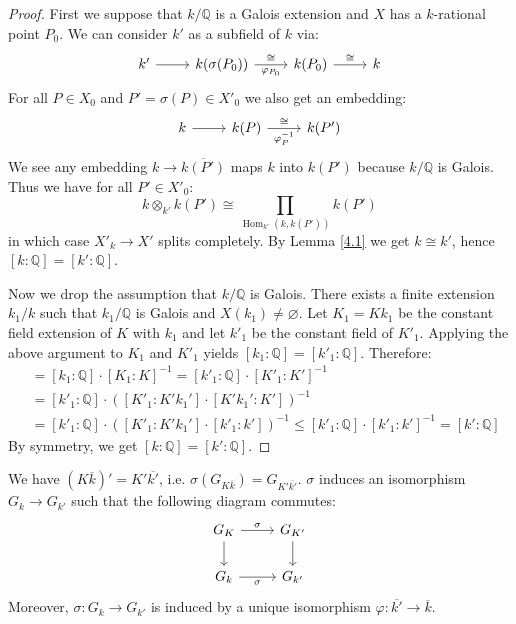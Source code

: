 \begin{proof}
First we suppose that $k/\mathbb{Q}$ is a Galois extension and $X$ has a $k$-rational point $P_0$. We can consider $k'$ as a subfield of $k$ via: 
\[\begin{tikzcd}
k'\ar[r] & k(\sigma(P_0))\ar[r, "\varphi_{P_0}"', "\cong"] & k(P_0) \ar[r, "\cong"] & k
\end{tikzcd}\]
For all $P\in X_0$ and $P'=\sigma(P)\in X'_0$ we also get an embedding:
\[ \begin{tikzcd}
k \ar[r] & k(P) \ar[r, "\varphi_P^{-1}"', "\cong"] & k(P')
\end{tikzcd} \]
We see any embedding $k\to \overline{k(P')}$ maps $k$ into $k(P')$ because $k/\mathbb{Q}$ is Galois. Thus we have for all $P'\in X'_0$:
\[ k\otimes_{k'} k(P')\cong \prod_{\operatorname{Hom}_{k'}(k, k(P'))} k(P') \]
in which case $X'_k\to X'$ splits completely. By Lemma \ref{4.1} we get $k\cong k'$, hence $[k:\mathbb{Q}]= [k':\mathbb{Q}]$.

Now we drop the assumption that $k/\mathbb{Q}$ is Galois. There exists a finite extension $k_1/k$ such that $k_1/\mathbb{Q}$ is Galois and $X(k_1)\neq\varnothing$. Let $K_1 = Kk_1$ be the constant field extension of $K$ with $k_1$ and let $k'_1$ be the constant field of $K'_1$. Applying the above argument to $K_1$ and $K'_1$ yields $[k_1:\mathbb{Q}] = [k'_1:\mathbb{Q}]$. Therefore:
\begin{align*}
[k:\mathbb{Q}] &= [k_1:\mathbb{Q}]\cdot [K_1:K]^{-1} = [k'_1:\mathbb{Q}]\cdot [K'_1:K']^{-1}\\
&= [k'_1:\mathbb{Q}]\cdot ([K'_1: K'k_1'] \cdot [K'k_1':K'])^{-1}\\
&= [k'_1:\mathbb{Q}]\cdot  ([K'_1: K'k_1'] \cdot [k'_1:k'])^{-1} \leq [k'_1:\mathbb{Q}]\cdot [k'_1:k']^{-1} = [k':\mathbb{Q}]
\end{align*}
By symmetry, we get $[k:\mathbb{Q}] = [k':\mathbb{Q}]$.
\end{proof}

\begin{lemma}\label{4.2}
We have $(K\overline{k})'=K'\overline{k'}$, i.e. $\sigma(G_{K\overline{k}})=G_{K'\overline{k'}}$. $\sigma$ induces an isomorphism $G_k\to G_{k'}$ such that the following diagram commutes:
\[ \begin{tikzcd}
G_K \ar[r, "\sigma"] \ar[d] & G_{K'}\ar[d]\\
G_k \ar[r, "\sigma"'] & G_{k'}
\end{tikzcd} \]
Moreover, $\sigma:G_k\to G_{k'}$ is induced by a unique isomorphism $\varphi:\overline{k'}\to\overline{k}$.
\end{lemma}

